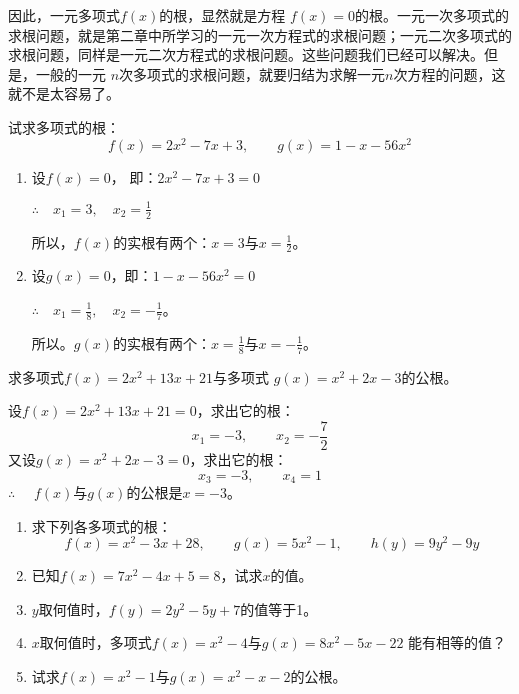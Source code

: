 因此，一元多项式$f(x)$的根，显然就是方程
$f(x)=0$的根。一元一次多项式的求根问题，就是第二章中所学习的一元一次方程式的求根问题；一元二次多项式的求根问题，同样是一元二次方程式的求根问题。这些问题我们已经可以解决。但是，一般的一元
$n$次多项式的求根问题，就要归结为求解一元$n$次方程的问题，这就不是太容易了。

\begin{example}
    试求多项式的根：
\[f (x) =2x^2-7x+3,\qquad g (x) =1-x-56x^2\]
\end{example}

\begin{solution}
  \begin{enumerate}
      \item 设$f(x)=0$，
      即：$2x^2-7x+3=0$

      $\therefore\quad x_1=3,\quad x_2=\frac{1}{2}$

      所以，$f(x)$的实根有两个：$x=3$与$x=\frac{1}{2}$。
      \item 设$g(x)=0$，即：$1-x-56x^2=0$
      
$\therefore\quad x_1=\frac{1}{8},\quad x_2=-\frac{1}{7}$。

所以。$g(x)$的实根有两个：$x=\frac{1}{8}$与$x=-\frac{1}{7}$。
  \end{enumerate}  
\end{solution}

\begin{example}
    求多项式$f(x)=2x^2+13x+21$与多项式
$g(x)=x^2+2x-3$的公根。
\end{example}

\begin{solution}
    设$f(x)=2x^2+13x+21=0$，求出它的根：
\[x_1=-3,\qquad x_2=-\frac{7}{2}\]
又设$g(x)=x^2+2x-3=0$，求出它的根：
\[x_3=-3,\qquad x_4=1\]
$\therefore\quad $ $f(x)$与$g(x)$的公根是$x=-3$。
\end{solution}

\begin{ex}
    \begin{enumerate}
        \item 求下列各多项式的根：
        \[f (x) =x^2-3x+28,\qquad g (x) =5x^2-1,\qquad h (y) =9y^2-9y\]
        \item 已知$f(x)=7x^2-4x+5=8$，试求$x$的值。
        \item $y$取何值时，$f(y)=2y^2-5y+7$的值等于1。
        \item $x$取何值时，多项式$f(x)=x^2-4$与$g(x)=8x^2-5x-22$
能有相等的值？
\item 试求$f(x)=x^2-1$与$g(x)=x^2-x-2$的公根。
    \end{enumerate}
\end{ex}



